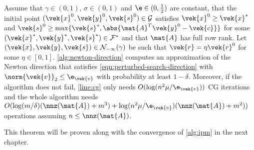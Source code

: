 \begin{theorem}\label{thm:approximate-newton-convergence}
  Assume that \(\gamma \in (0, 1)\), \(\sigma \in (0, 1)\) and \(\e \in (0, \frac{1}{2})\) are constant, that the initial point \((\vek{x}^0, \vek{y}^0, \vek{s}^0) \in \mathcal{G}\) satisfies \(\vek{x}^0 \geq \vek{x}^*\) and \(\vek{s}^0 \geq \max \{\vek{s}^*, \abs{\mat{A}^T \vek{y}^0 - \vek{c}}\}\) for some \((\vek{x}^*, \vek{y}^*, \vek{s}^*) \in \mathcal{F}^*\) and that \(\mat{A}\) has full row rank.
  Let \((\vek{x}, \vek{y}, \vek{s}) \in \mathcal{N}_{-\infty}(\gamma)\) be such that \(\vek{r} = \eta \vek{r}^0\) for some \(\eta \in [0, 1]\).
  \cref{alg:newton-direction} computes an approximation of the Newton direction that satisfies \cref{eqn:perturbed-search-direction} with \(\norm{\vek{v}}_2 \leq \e_{\vek{v}}\) with probability at least \(1 - \delta\).
  Moreover, if the algorithm does not fail, \cref{line:cg} only needs \(O(\log(n^2 \mu / \e_{\vek{v}}))\) CG iterations and the whole algorithm needs \(O(\log(m/\delta) (\nnz(\mat{A}) + m^3) + \log(n^2 \mu / \e_{\vek{v}})(\nnz(\mat{A}) + m^2))\) operations assuming \(n \leq \nnz(\mat{A})\).
\end{theorem}

This theorem will be proven along with the convergence of \cref{alg:ipm} in the next chapter.